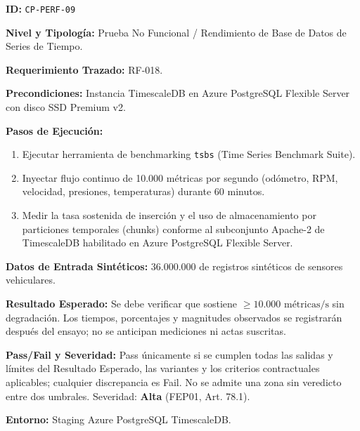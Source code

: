 \par\noindent\textbf{ID:} \texttt{C\allowbreak{}P\allowbreak{}-\allowbreak{}P\allowbreak{}E\allowbreak{}R\allowbreak{}F\allowbreak{}-\allowbreak{}0\allowbreak{}9\allowbreak{}}\par
\par\noindent\textbf{Nivel y Tipología:} Prueba No Funcional / Rendimiento de Base de Datos de Series de Tiempo.\par
\par\noindent\textbf{Requerimiento Trazado:} RF-018.\par
\par\noindent\textbf{Precondiciones:} Instancia TimescaleDB en Azure PostgreSQL Flexible Server con disco SSD Premium v2.\par
\par\noindent\textbf{Pasos de Ejecución:} \par
\begin{enumerate}
\item Ejecutar herramienta de benchmarking \texttt{t\allowbreak{}s\allowbreak{}b\allowbreak{}s\allowbreak{}} (Time Series Benchmark Suite).
\item Inyectar flujo continuo de 10.000 métricas por segundo (odómetro, RPM, velocidad, presiones, temperaturas) durante 60 minutos.
\item Medir la tasa sostenida de inserción y el uso de almacenamiento por particiones temporales (chunks) conforme al subconjunto Apache-2 de TimescaleDB habilitado en Azure PostgreSQL Flexible Server.
\end{enumerate}
\par\noindent\textbf{Datos de Entrada Sintéticos:} 36.000.000 de registros sintéticos de sensores vehiculares.\par
\par\noindent\textbf{Resultado Esperado:} Se debe verificar que sostiene \(\ge 10.000\text{ métricas/s}\) sin degradación. Los tiempos, porcentajes y magnitudes observados se registrarán después del ensayo; no se anticipan mediciones ni actas suscritas.\par
\par\noindent\textbf{Pass/Fail y Severidad:} Pass únicamente si se cumplen todas las salidas y límites del Resultado Esperado, las variantes y los criterios contractuales aplicables; cualquier discrepancia es Fail. No se admite una zona sin veredicto entre dos umbrales. Severidad: \textbf{Alta} (FEP01, Art. 78.1).\par
\par\noindent\textbf{Entorno:} Staging Azure PostgreSQL TimescaleDB.\par







